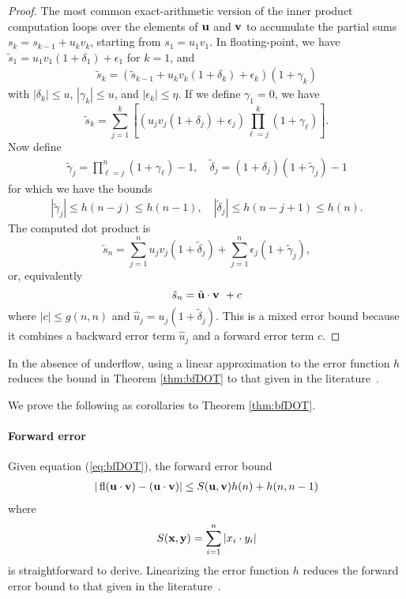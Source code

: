 \begin{proof}
The most common exact-arithmetic version of the inner product
computation loops over the elements of $\textbf{u}$ and $\textbf{v}$
to accumulate the partial sums $s_k= s_{k-1} + u_k v_k$,
starting from $s_1 = u_1 v_1$.  In floating-point, we have
$\tilde{s}_1 = u_1 v_1 (1+ \delta_1) + \epsilon_1$ for $k = 1$,
and
\begin{align}
  \tilde{s}_k
= (\tilde{s}_{k-1} + u_k v_k (1+\delta_k) + \epsilon_k)
(1+\gamma_k) \label{eq:partialsum}
\end{align}
with $|\delta_k| \le u$, $|\gamma_k| \le u$, and
$|\epsilon_k| \le \eta$.  If we define $\gamma_1 = 0$, we have
\[
  \tilde{s}_k =
\sum_{j=1}^k \left[ \left( u_j v_j (1 + \delta_j) + \epsilon_j
\right)
    \prod_{\ell = j}^k (1 + \gamma_\ell) \right].
\]
Now define
\begin{align*}
\tilde{\gamma}_j = \prod_{\ell=j}^n (1 + \gamma_\ell) - 1, \quad
\tilde{\delta}_j = (1 + \delta_j) (1 + \tilde{\gamma}_j) - 1 
\end{align*}
for which we have the bounds
\begin{align*}
|\tilde{\gamma}_j| \leq h(n-j) \leq h(n-1) , \quad
|\tilde{\delta}_j| \leq h(n-j+1) \leq h(n).
\end{align*}
The computed dot product is
\[
  \tilde{s}_n =
    \sum_{j=1}^n u_j v_j (1+\tilde{\delta}_j) +
    \sum_{j=1}^n \epsilon_j (1 + \tilde{\gamma}_j),
\]
or, equivalently
\[
  \tilde{s}_n =
    \hat{\textbf{u}} \cdot \textbf{v } + c
\]
where $|c| \leq g(n,n)$ and
$\hat{u}_j = u_j (1 + \tilde{\delta}_j)$. This is a mixed error
bound
because it combines a backward error term
$\hat{u}_j$ and a forward error term $c$.
\end{proof}

In the absence of underflow, using a linear approximation to
the error function $h$ reduces the bound in Theorem
\ref{thm:bfDOT} to that given in the literature~\cite[sec
3.1]{higham_book}.

We prove the following as corollaries to Theorem
\ref{thm:bfDOT}.

\paragraph{Forward error} Given equation (\ref{eq:bfDOT}), the
forward error bound
\begin{align}| \fl({\textbf{u}} \cdot {\textbf{v}}) - ({\vc{u}}
\cdot {\textbf{v}}) | \le S({\vc{u}},{\vc{v}}) h(n) + h(n, n-1)
\label{eq:fDOT} \end{align}  where 
\begin{align}
S(\vc{x}, \vc{y}) = \sum_{i=1}^n |x_i \cdot y_i|
\label{eq:rabsdot}
\end{align}
is straightforward to derive. Linearizing the error function $h$ reduces the forward error
bound to that given in the literature~\cite{blas02_mixed}.


